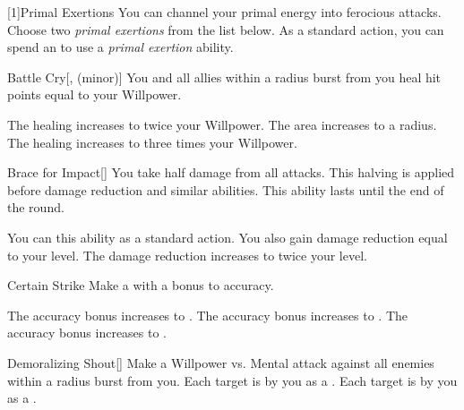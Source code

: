         [1]{Primal Exertions}
        You can channel your primal energy into ferocious attacks.
        Choose two \textit{primal exertions} from the list below.
        As a standard action, you can spend an  to use a \textit{primal exertion} ability.
        {
            \begin{ability}{Battle Cry}[,  (minor)]
                You and all allies within a \arealarge radius burst from you heal hit points equal to your Willpower.

                \rankline
                 The healing increases to twice your Willpower.
                 The area increases to a \areahuge radius.
                 The healing increases to three times your Willpower.
            \end{ability}

            \begin{ability}{Brace for Impact}[]
                You take half damage from all attacks.
                This halving is applied before damage reduction and similar abilities.
                This ability lasts until the end of the round.

                \rankline
                 You can  this ability as a standard action.
                 You also gain damage reduction equal to your level.
                 The damage reduction increases to twice your level.
            \end{ability}

            \begin{ability}{Certain Strike}
                Make a  with a  bonus to accuracy.

                \rankline
                 The accuracy bonus increases to .
                 The accuracy bonus increases to .
                 The accuracy bonus increases to .
            \end{ability}

            \begin{ability}{Demoralizing Shout}[]
                Make a Willpower vs. Mental attack against all enemies within a \arealarge radius burst from you.
                \hit Each target is  by you as a .
                \crit Each target is  by you as a .


\end{ability}}
